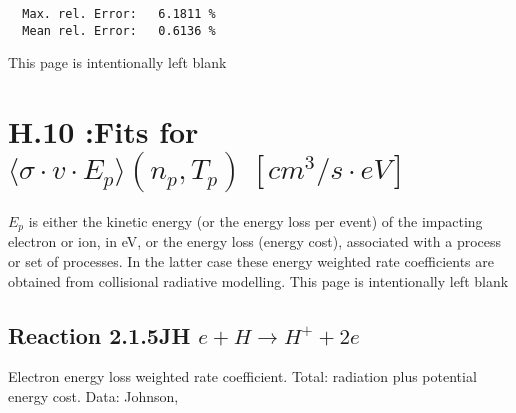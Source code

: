 \documentclass[12pt,dvipdfmx]{article}
\begin{document}
\begin{small}
\begin{verbatim}
  Max. rel. Error:   6.1811 %
  Mean rel. Error:   0.6136 %

\end{verbatim}\end{small}



\newpage
This page is intentionally left blank
\newpage
\section{H.10 :Fits for $\langle\sigma \cdot v \cdot E_p \rangle (n_p,T_p) \
[cm^3/s \cdot eV]$}

$E_p$ is either the kinetic energy (or the energy loss per event) of the impacting electron or ion, in eV, or the
energy loss (energy cost), associated with a process or set of processes.
In the latter case these energy weighted rate coefficients are obtained from
collisional radiative modelling.
\newpage
This page is intentionally left blank
\newpage

\subsection{
Reaction 2.1.5JH  $ e + H \rightarrow H^+ + 2e $
}

Electron energy loss weighted rate coefficient.
Total: radiation plus potential energy cost. Data: Johnson, \cite{kn:Mahn}
\end{document}
